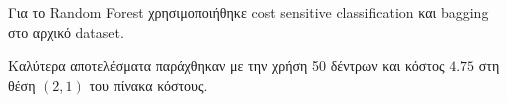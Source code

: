 Για το Random Forest χρησιμοποιήθηκε cost sensitive classification
και bagging στο αρχικό dataset.

Καλύτερα αποτελέσματα παράχθηκαν με την χρήση 50 δέντρων και κόστος $4.75$ στη θέση $(2,1)$ του πίνακα κόστους.
